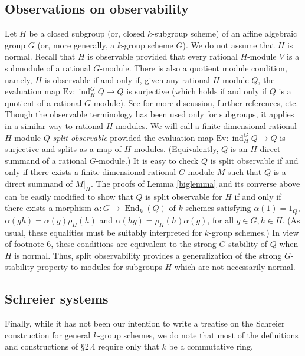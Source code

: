 \documentclass[11pt,leqno,amscd,amssymb,verbatim, url]{amsart}
\theoremstyle{definition}
\numberwithin{equation}{thm}
\newcommand{\End}{\operatorname{End}}
\newcommand{\ind}{\operatorname{ind}}
\begin{document}
\subsection{Observations on observability} Let $H$ be a closed subgroup (or, closed $k$-subgroup scheme) of an affine algebraic group $G$ (or,
more generally, a $k$-group scheme $G$). We do not assume that $H$ is normal. Recall that $H$ is observable provided that
every rational $H$-module $V$ is a submodule of a rational $G$-module. There is also a
quotient module condition, namely,  $H$ is observable if and only if, given
any rational $H$-module $Q$, the evaluation map $\text{Ev}:\ind_H^GQ\to Q$ is surjective (which holds
if and only if
$Q$ is a quotient of a rational $G$-module). See \cite{Grosshans} for
more discussion, further references, etc. Though the observable terminology has been used only for subgroups, it applies
in a similar way to rational $H$-modules. We will call a finite dimensional rational $H$-module $Q$ {\it split observable}
provided the evaluation map $\text{Ev}:\ind_H^GQ\to Q$ is surjective and splits as a map of $H$-modules.
(Equivalently, $Q$ is an $H$-direct summand of a rational $G$-module.) It is easy to check $Q$ is
split observable if and only if there exists a finite dimensional rational $G$-module $M$ such that $Q$ is a
direct summand of $M|_H$. 
The proofs of Lemma \ref{biglemma} and its converse above can be easily modified to show that $Q$ is split observable for $H$
if and only if there exists a morphism $\alpha:G\to \End_k(Q)$ of $k$-schemes satisfying $\alpha(1)=1_Q$, $\alpha(gh)=\alpha(g)\rho_H(h)$
and $\alpha(hg)=\rho_H(h)\alpha(g)$, for all $g\in G,h\in H$. (As usual, these equalities must be suitably interpreted for
$k$-group schemes.) In view of footnote 6, these conditions are equivalent to the strong $G$-stability
of $Q$ when $H$ is normal. Thus, split observability provides a generalization of the strong $G$-stability
property to modules  for subgroups $H$ which are not necessarily normal.

\subsection{Schreier systems} Finally, while it has not been our intention to write a treatise on the Schreier construction for general $k$-group schemes, we do note that most of the definitions and constructions of \S2.4 require only that $k$ be a commutative ring.
\end{document}
